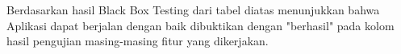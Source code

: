 \par Berdasarkan hasil Black Box Testing dari tabel diatas menunjukkan bahwa Aplikasi dapat berjalan dengan baik dibuktikan dengan "berhasil" pada kolom hasil pengujian masing-masing fitur yang dikerjakan.

